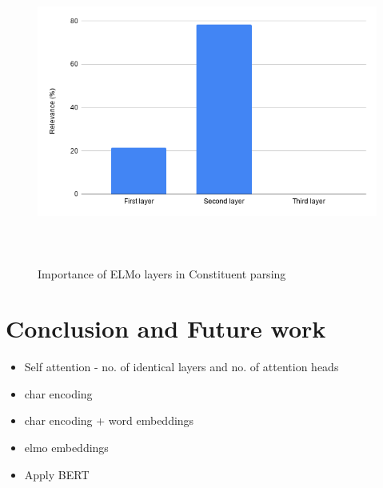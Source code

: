 \documentclass[a4paper, 11pt]{article}
\begin{document}
\begin{figure}[H]
    \centering
    \includegraphics[width=\textwidth,height=10cm,keepaspectratio=true]
    {elmo-layers-relevance.png}
    \caption{
        Importance of ELMo layers in Constituent parsing
    }
    \label{fig:elmo-layers-relevance}
\end{figure}





\pagebreak
\section{Conclusion and Future work}

\begin{itemize}
\item Self attention - no. of identical layers and no. of attention heads
\item char encoding
\item char encoding + word embeddings
\item elmo embeddings
\item Apply BERT
\end{itemize}





 

\newpage
\printbibliography
%
\end{document}
